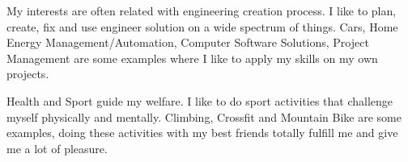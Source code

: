 \begin{cventries}
  \cventry
    {}
    {}
    {}
    {}
    {
  \vspace{-5 mm}
 \begin{cvitems}
        \item {My interests are often related with engineering creation process. I like to plan, create, fix and use engineer solution on a wide spectrum of things. Cars, Home Energy Management/Automation, Computer Software Solutions, Project Management are some examples where I like to apply my skills on my own projects.}
\item {Health and Sport guide my welfare. I like to do sport activities that challenge myself physically and mentally. Climbing, Crossfit and Mountain Bike are some examples, doing these activities with my best friends totally fulfill me and give me a lot of pleasure.}
      \end{cvitems}
    }
\end{cventries}
